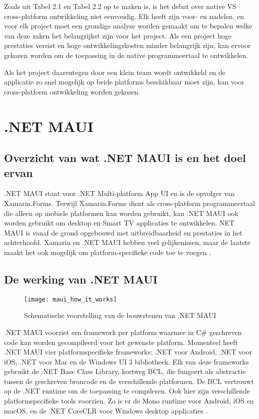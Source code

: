 Zoals uit Tabel 2.1 \textcite{KotlinFoundation2023} en Tabel 2.2 \textcite{KotlinFoundation2023} op te maken is, is het debat over native VS cross-platform ontwikkeling niet eenvoudig. Elk heeft zijn voor- en nadelen, en voor elk project moet een grondige analyse worden gemaakt om te bepalen welke van deze zaken het belangrijkst zijn voor het project. Als een project hoge prestaties vereist en hoge ontwikkelingskosten minder belangrijk zijn, kan ervoor gekozen worden om de toepassing in de native programmeertaal te ontwikkelen.

Als het project daarentegen door een klein team wordt ontwikkeld en de applicatie zo snel mogelijk op beide platforms beschikbaar moet zijn, kan voor cross-platform ontwikkeling worden gekozen.

\section{.NET MAUI}
\subsection{Overzicht van wat .NET MAUI is en het doel ervan}
.NET MAUI staat voor .NET Multi-platform App UI en is de opvolger van Xamarin.Forms. Terwijl Xamarin.Forms dient als cross-platform programmeertaal die alleen op mobiele platformen kan worden gebruikt, kan .NET MAUI ook worden gebruikt om desktop en Smart TV applicaties te ontwikkelen. NET MAUI is vanaf de grond opgebouwd met uitbreidbaarheid en prestaties in het achterhoofd. Xamarin en .NET MAUI hebben veel gelijkenissen, maar de laatste maakt het ook mogelijk om platform-specifieke code toe te voegen \autocite{BradyGaster2020}.

\subsection{De werking van .NET MAUI}
\begin{figure}
    \texttt{[image: maui\_how\_it\_works]}
    \centering
    \caption[Schematische voorstelling van de bouwstenen van .NET MAUI]{Schematische voorstelling van de bouwstenen van .NET MAUI \autocite{Britch2023}}
    \label{fig:mauiCompilationScheme}
\end{figure}
.NET MAUI voorziet een framework per platform waarmee in C\# geschreven code kan worden gecompileerd voor het gewenste platform. Momenteel heeft .NET MAUI vier platformspecifieke frameworks: .NET voor Android, .NET voor iOS, .NET voor Mac en de Windows UI 3 bibliotheek. Elk van deze frameworks gebruikt de .NET Base Class Library, kortweg BCL, die fungeert als abstractie tussen de geschreven broncode en de verschillende platformen. De BCL vertrouwt op de .NET runtime om de toepassing te compileren. Ook hier zijn verschillende platformspecifieke tools voorzien. Zo is er de Mono runtime voor Android, iOS en macOS, en de .NET CoreCLR voor Windows desktop applicaties \autocite{Britch2023}.

